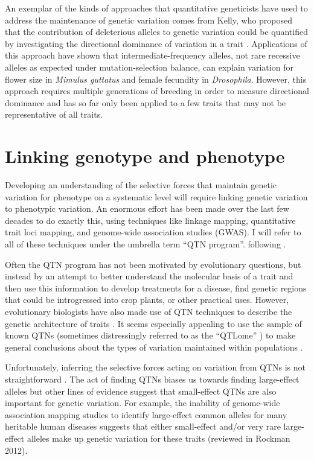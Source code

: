 An exemplar of the kinds of approaches that quantitative geneticists have used to address the maintenance of genetic variation comes from Kelly, who proposed that the contribution of deleterious alleles to genetic variation could be quantified by investigating the directional dominance of variation in a trait \citep{Kelly1999-re}. Applications of this approach have shown that intermediate-frequency alleles, not rare recessive alleles as expected under mutation-selection balance, can explain variation for flower size in \textit{Mimulus guttatus} and female fecundity in \textit{Drosophila}. \citep{Kelly2001-rc,Charlesworth2007-rp} However, this approach requires multiple generations of breeding in order to measure directional dominance and has so far only been applied to a few traits that may not be representative of all traits. 

\section{Linking genotype and phenotype}
Developing an understanding of the selective forces that maintain genetic variation for phenotype on a systematic level will require linking genetic variation to phenotypic variation. An enormous effort has been made over the last few decades to do exactly this, using techniques like linkage mapping, quantitative trait loci mapping, and genome-wide association studies (GWAS). I will refer to all of these techniques under the umbrella term “QTN program”. following \citet{Rockman2012-ks}.

Often the QTN program has not been motivated by evolutionary questions, but instead by an attempt to better understand the molecular basis of a trait and then use this information to develop treatments for a disease, find genetic regions that could be introgressed into crop plants, or other practical uses. However, evolutionary biologists have also made use of QTN techniques to describe the genetic architecture of traits \citep{lynch1998}. It seems especially appealing to use the sample of known QTNs (sometimes distressingly referred to as the “QTLome” \citep{Martinez_undated-wg}) to make general conclusions about the types of variation maintained within populations \citep{Barton2002-do}.

Unfortunately, inferring the selective forces acting on variation from QTNs is not straightforward \citep{Rockman2012-ks,Johnson2005-dl}. The act of finding QTNs biases us towards finding large-effect alleles but other lines of evidence suggest that small-effect QTNs are also important for genetic variation. For example, the inability of genome-wide association mapping studies to identify large-effect common alleles for many heritable human diseases suggests that either small-effect and/or very rare large-effect alleles make up genetic variation for these traits (reviewed in Rockman 2012). 

